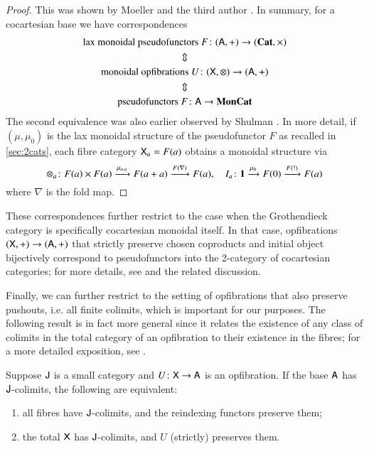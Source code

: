 \documentclass[reqno]{amsart}
\begin{document}
\begin{proof}
This was shown by Moeller and the third author \cite[Theorems~3.13\&4.1]{MV}. In summary, for a cocartesian base we have correspondences
\begin{gather}
\textrm{lax monoidal pseudofunctors }F\colon(\mathsf{A},+)\to(\mathbf{Cat},\times) \notag\\
\Updownarrow \notag\\
\textrm{monoidal opfibrations }U\colon(\mathsf{X},\otimes)\to(\mathsf{A},+) \label{monGroth}\\
\Updownarrow \notag\\
\textrm{pseudofunctors }F\colon\mathsf{A}\to\mathbf{MonCat} \notag
\end{gather}
The second equivalence was also earlier observed by Shulman \cite{Shulman2008}. In more detail, if $(\mu,\mu_0)$ is the lax monoidal structure of the pseudofunctor $F$ as recalled in \cref{sec:2cats}, each fibre category $\mathsf{X}_a=F(a)$ obtains a monoidal structure via
\begin{equation}\label{eq:explicitstructure1}
\otimes_a\colon F(a)\times F(a)\xrightarrow{\mu_{a,a}}F(a+a)\xrightarrow{F(\nabla)}F(a),\quad
I_a\colon\mathbf{1}\xrightarrow{\mu_0}F(0)\xrightarrow{F(!)}F(a)
\end{equation}
where $\nabla$ is the fold map. 
\end{proof}

These correspondences further restrict to the case when the Grothendieck category is specifically cocartesian monoidal itself. In that case, opfibrations
$(\mathsf{X},+)\to(\mathsf{A},+)$ that strictly preserve chosen coproducts and initial object
bijectively correspond to pseudofunctors into the 2-category of cocartesian categories; for more details, see \cite[Corollary 4.7]{MV} and the related discussion.

Finally, we can further restrict to the setting of opfibrations that also preserve pushouts, i.e. all finite colimits, which is important for our purposes. The following result is in fact more general since it relates the existence of any class of colimits in the total category of an opfibration to their existence in the fibres; for a more detailed exposition, see \cite[Corollary~4.9]{Hermida1999}.

\begin{lem}\label{lem:fibrewiselimits}
Suppose $\mathsf{J}$ is a small category and $U\colon\mathsf{X}\to\mathsf{A}$ is an opfibration. If the base $\mathsf{A}$ has $\mathsf{J}$-colimits,
the following are equivalent:
\begin{enumerate}
 \item all fibres have $\mathsf{J}$-colimits, and the reindexing functors preserve them;
 \item the total $\mathsf{X}$ has $\mathsf{J}$-colimits, and $U$ (strictly) preserves them.
\end{enumerate}
\end{lem}
\end{document}
